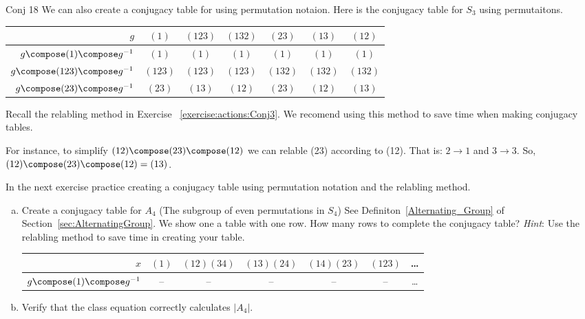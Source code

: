 \begin {example}{Conj 18}
We can also create a conjugacy table for using permutation notaion. Here is the conjugacy table for $S_3$ using permutaitons.
  
\begin{center}
\begin{tabular}{|r | c | c |c | c | c |c |}\hline
$g$ &$(1)$ & $(123)$ &$(132)$ & $(23)$ & $(13)$ & $(12)$\\ \hline
$g\compose (1)\compose g^{-1}$ &$(1)$ & $(1)$ & $(1)$ &$(1)$ &$(1)$ & $(1)$ \\ \hline
$ g\compose (123)\compose g^{-1}$& $(123)$&$(123)$& $(123)$&$(132)$ &$(132)$ & $(132)$\\ \hline
$g\compose(23)\compose g^{-1}$ & $(23)$ &$(13)$ & $(12)$ & $(23)$ & $(12)$ & $(13)$\\ \hline 
\end{tabular}
\end{center}

Recall the relabling method in Exercise  ~\ref{exercise:actions:Conj3}.  We recomend using this method to save time when making conjugacy tables.  

For instance, to simplify $(12)\compose (23)\compose (12)$ we can relable (23) according to (12).  That is: $2\rightarrow 1$ and $3\rightarrow 3$.  So,  $(12)\compose (23)\compose (12)=(13)$.
\end{example}

In the next exercise practice creating a conjugacy table using permutation notation and the relabling method.

\begin{exercise}\label{exercise:actions:Conj 19}
\begin{enumerate}[(a)]
\item Create a conjugacy table for $A_4$ (The subgroup of even permutations in $S_4$) See Definiton~\ref {Alternating_Group} of Section~\ref{sec:AlternatingGroup}. We show one a table with one row.  How many rows to complete the conjugacy table? \emph{Hint}: Use the relabling method to save time in creating your table.

\begin{center}
\begin{tabular}
{|r |c| c| c| c| c|c}\hline
 $x$& $(1)$& $(12)(34)$&$(13)(24)$&$(14)(23)$&$(123)$&\ldots\\ \hline
$g \compose(1)\compose g^{-1}$ & -- & --& --&--&--& \ldots \\ 
\end{tabular}
\end{center}

\item Verify that the class equation correctly calculates $|A_4|$.
\end {enumerate}
\end {exercise}


